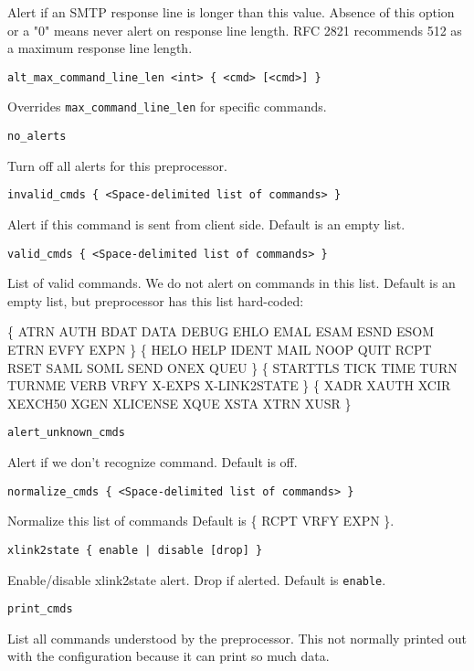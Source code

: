 \documentclass[english]{report}
\newcounter{slistnum}
\newenvironment{slist}
{ \begin{list}{ {\bf \arabic{slistnum}.} }{\usecounter{slistnum} } }
{ \end{list} }
\begin{document}
\begin{slist}
Alert if an SMTP response line is longer than this value.  Absence of this
option or a "0" means never alert on response line length.  RFC 2821 recommends
512 as a maximum response line length.

\item \texttt{alt\_max\_command\_line\_len <int> \{ <cmd> [<cmd>] \}}

Overrides \texttt{max\_command\_line\_len} for specific commands.

\item \texttt{no\_alerts}

Turn off all alerts for this preprocessor.

\item \texttt{invalid\_cmds \{ <Space-delimited list of commands> \}}

Alert if this command is sent from client side.  Default is an empty list.

\item \texttt{valid\_cmds \{ <Space-delimited list of commands> \}}

List of valid commands.  We do not alert on commands in this list.  Default is
an empty list, but preprocessor has this list hard-coded:

\{ ATRN AUTH BDAT DATA DEBUG EHLO EMAL ESAM ESND ESOM ETRN EVFY EXPN \}
\{ HELO HELP IDENT MAIL NOOP QUIT RCPT RSET SAML SOML SEND ONEX QUEU \}
\{ STARTTLS TICK TIME TURN TURNME VERB VRFY X-EXPS X-LINK2STATE \}
\{ XADR XAUTH XCIR XEXCH50 XGEN XLICENSE XQUE XSTA XTRN XUSR  \}

\item \texttt{alert\_unknown\_cmds}

Alert if we don't recognize command.  Default is off.

\item \texttt{normalize\_cmds \{ <Space-delimited list of commands> \}}

Normalize this list of commands Default is \{ RCPT VRFY EXPN \}.

\item \texttt{xlink2state \{ enable | disable [drop] \}}

Enable/disable xlink2state alert.  Drop if alerted.  Default is
\texttt{enable}.

\item \texttt{print\_cmds}

List all commands understood by the preprocessor.  This not normally printed
out with the configuration because it can print so much data.

\end{slist}
\end{document}
